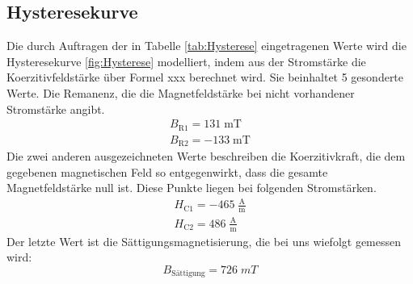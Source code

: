 \documentclass[titlepage = firstcover]{scrartcl}
\begin{document}
            \subsection{Hysteresekurve}
                Die durch Auftragen der in Tabelle \ref{tab:Hysterese} eingetragenen Werte wird die Hysteresekurve \ref{fig:Hysterese} modelliert, indem aus 
                der Stromstärke die Koerzitivfeldstärke über Formel xxx berechnet wird. Sie beinhaltet 
                5 gesonderte Werte. Die Remanenz, die die Magnetfeldstärke bei nicht vorhandener Stromstärke angibt.
                \begin{align}
                    B_{\text{R1}} = 131 \; \text{mT} \\
                    B_{\text{R2}} = -133 \; \text{mT} 
                    \label{eqn:Remanenzen}
                \end{align}
                Die zwei anderen ausgezeichneten Werte beschreiben die Koerzitivkraft, die dem gegebenen magnetischen Feld so entgegenwirkt, dass die gesamte
                Magnetfeldstärke null ist. Diese Punkte liegen bei folgenden Stromstärken.
                \begin{align}
                    H_{\text{C1}} = -465 \; \frac{\text{A}}{\text{m}}\\
                    H_{\text{C2}} = 486 \; \frac{\text{A}}{\text{m}}
                    \label{eqn:Koerzitiv}
                \end{align} 
                Der letzte Wert ist die Sättigungsmagnetisierung, die bei uns wiefolgt gemessen wird:
                \begin{equation*}
                    B_{\text{Sättigung}} = 726 \; mT
                \end{equation*}
\end{document}
